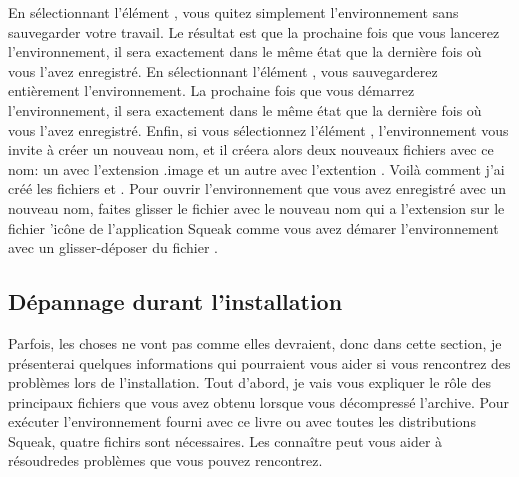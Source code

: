 \documentclass[a4paper,10pt,twoside]{book}
\begin{document}
En s\'electionnant l'\'el\'ement , vous quitez simplement l'environnement sans sauvegarder votre travail. Le r\'esultat est que la prochaine fois que vous lancerez l'environnement, il sera exactement dans le m\^eme \'etat que la derni\`ere fois o\`u vous l'avez enregistr\'e. En s\'electionnant l'\'el\'ement , vous sauvegarderez enti\`erement l'environnement. La prochaine fois que vous d\'emarrez l'environnement, il sera exactement dans le m\^eme \'etat que la derni\`ere fois o\`u vous l'avez enregistr\'e.
Enfin, si vous s\'electionnez l'\'el\'ement , l'environnement vous invite \`a cr\'eer un nouveau nom, et il cr\'eera alors deux nouveaux fichiers avec ce nom: un avec l'extension .image et un autre avec l'extention . Voil\`a comment j'ai cr\'e\'e les fichiers  et . Pour ouvrir l'environnement que vous avez enregistr\'e avec un nouveau nom, faites glisser le fichier avec le nouveau nom qui a l'extension  sur le fichier 'ic\^one de l'application Squeak comme vous avez d\'emarer l'environnement avec un glisser-d\'eposer du fichier .


\subsection{D\'epannage durant l'installation}
Parfois, les choses ne vont pas comme elles devraient, donc dans cette section, je pr\'esenterai quelques informations qui pourraient vous aider si vous rencontrez des probl\`emes lors de l'installation. Tout d'abord, je vais vous expliquer le r\^ole des principaux fichiers que vous avez obtenu lorsque vous d\'ecompress\'e l'archive.
Pour ex\'ecuter l'environnement fourni avec ce livre ou avec toutes les distributions Squeak, quatre fichirs sont n\'ecessaires. Les conna\^itre peut vous aider \`a r\'esoudredes probl\`emes que vous pouvez rencontrez. 
\end{document}
